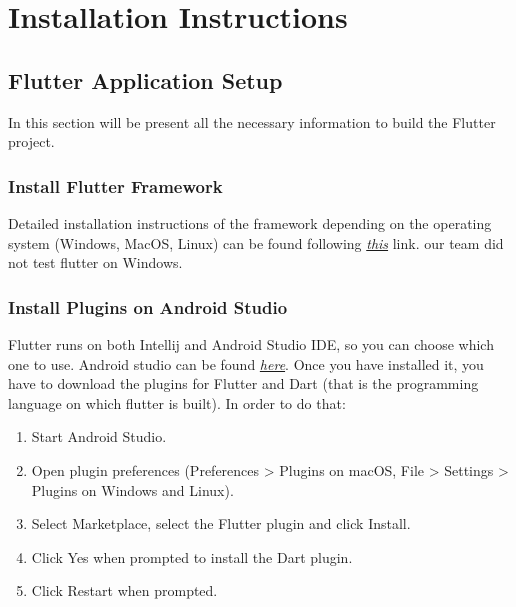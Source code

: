 \documentclass[../RASD.tex]{subfiles}
\begin{document}
    \chapter{Installation Instructions}\label{ch:installation-instructions}
\section{Flutter Application Setup}\label{sec:flutter-application-setup}
In this section will be present all the necessary information to build the
Flutter project.
\subsection{Install Flutter Framework}\label{subsec:install-flutter-framework}
Detailed installation instructions of the framework depending on the operating system (Windows, MacOS, Linux)
    can be found following
    \href{https://flutter.dev/docs/get-started/install}{\textit{this}} link.
    our team did not test flutter on Windows.
\subsection{Install Plugins on Android Studio}\label{subsec:install-plugins-on-android-studio}
    Flutter runs on both Intellij and Android Studio IDE, so you can choose which one to use.
    Android studio can be found \href{https://developer.android.com/studio}{\textit{here}}.
    Once you have installed it, you have to download the plugins for Flutter and Dart (that is the programming language on which flutter is built).
    In order to do that:
    \begin{enumerate}
        \item Start Android Studio.
        \item Open plugin preferences (Preferences > Plugins on macOS, File > Settings > Plugins on Windows and Linux).
        \item Select Marketplace, select the Flutter plugin and click Install.
        \item Click Yes when prompted to install the Dart plugin.
        \item Click Restart when prompted.
    \end{enumerate}
\end{document}
